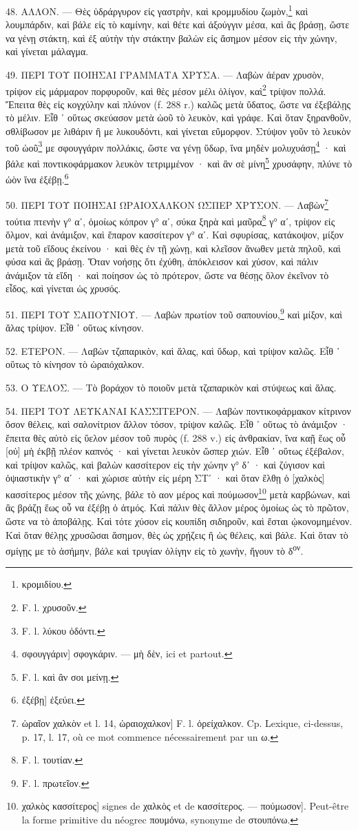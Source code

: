 \documentclass[a4paper, 11pt, oneside, polutonikogreek, french]{article}
\begin{document}
48. ΑΛΛΟΝ. --- Θὲς ὑδράργυρον εἰς γαστρὴν, καὶ κρομμυδίου ζωμὸν,\footnote{κρομιδίου.} καὶ λουμπάρδιν, καὶ βάλε εἰς τὸ καμίνην, καὶ θέτε καὶ ἀξούγγιν μέσα, καὶ ἂς βράσῃ, ὥστε να γένῃ στάκτη, καὶ ἐξ αὐτὴν τὴν στάκτην βαλὼν εἰς ἄσημον μέσον εἰς τὴν χώνην, καὶ γίνεται μάλαγμα.

49. ΠΕΡΙ ΤΟΥ ΠΟΙΗΣΑΙ ΓΡΑΜΜΑΤΑ ΧΡΥΣΑ. --- Λαβὼν ἀέραν χρυσὸν, τρίψον εἰς μάρμαρον πορφυροῦν, καὶ θὲς μέσον μέλι ὀλίγον, καὶ\footnote{F. l. χρυσοῦν.} τρίψον πολλά. Ἔπειτα θὲς εἰς κογχύλην καὶ πλύνον (f. 288 r.) καλῶς μετὰ ὕδατος, ὥστε να ἐξεβάλῃς τὸ μέλιν. Εἶθ ᾽ οὕτως σκεύασον μετὰ ὠοῦ τὸ λευκὸν, καὶ γράφε. Καὶ ὅταν ξηρανθοῦν, σθλίβωσον με λιθάριν ἢ με λυκουδόντι, καὶ γίνεται εὔμορφον. Στύψον γοῦν τὸ λευκὸν τοῦ ὠοῦ\footnote{F. l. λύκου ὀδόντι.} με σφουγγάριν πολλάκις, ὥστε να γένῃ ὕδωρ, ἵνα μηδὲν μολυχυάσῃ\footnote{σφουγγάριν] σφογκάριν. --- μὴ δὲν, ici et partout.} · καὶ βάλε καὶ ποντικοφάρμακον λευκὸν τετριμμένον · καὶ ἂν σὲ μίνη\footnote{F. l. καὶ ἂν σοι μείνῃ.} χρυσάφην, πλύνε τὸ ὠὸν ἵνα ἐξέβῃ.\footnote{ἐξέβῃ] ἐξεύει.}

50. ΠΕΡΙ ΤΟΥ ΠΟΙΗΣΑΙ ΩΡΑΙΟΧΑΛΚΟΝ ΩΣΠΕΡ ΧΡΥΣΟΝ. --- Λαβὼν\footnote{ὡραῖον χαλκὸν et l. 14, ὡραιοχαλκον] F. l. ὀρείχαλκον. Cp. Lexique, ci-dessus, p. 17, l. 17, où ce mot commence nécessairement par un ω.} τούτια πτενὴν γ° αʹ, ὁμοίως κόπρον γ° αʹ, σύκα ξηρὰ καὶ μαῦρα\footnote{F. l. τουτίαν.} γ° αʹ, τρίψον εἰς ὅλμον, καὶ ἀνάμιξον, καὶ ἔπαρον κασσίτερον γ° αʹ. Καὶ σφυρίσας, κατάκοψον, μίξον μετὰ τοῦ εἴδους ἐκείνου · καὶ θὲς ἐν τῇ χώνῃ, καὶ κλεῖσον ἄνωθεν μετὰ πηλοῦ, καὶ φύσα καὶ ἂς βράσῃ. Ὅταν νοήσῃς ὅτι ἐχύθη, ἀπόκλεισον καὶ χύσον, καὶ πάλιν ἀνάμιξον τὰ εἴδη · καὶ ποίησον ὡς τὸ πρότερον, ὥστε να θέσῃς ὅλον ἐκεῖνον τὸ εἶδος, καὶ γίνεται ὡς χρυσός.

51. ΠΕΡΙ ΤΟΥ ΣΑΠΟΥΝΙΟΥ. --- Λαβὼν πρωτίον τοῦ σαπουνίου,\footnote{F. l. πρωτεῖον.} καὶ μίξον, καὶ ἅλας τρίψον. Εἶθ ᾽ οὕτως κίνησον.

52. ΕΤΕΡΟΝ. --- Λαβὼν τζαπαρικὸν, καὶ ἅλας, καὶ ὕδωρ, καὶ τρίψον καλῶς. Εἷθ ᾽ οὕτως τὸ κίνησον τὸ ὡραιόχαλκον.

53. Ο ΥΕΛΟΣ. --- Τὸ βοράχον τὸ ποιοῦν μετὰ τζαπαρικὸν καὶ στύψεως καὶ ἅλας.

54. ΠΕΡΙ ΤΟΥ ΛΕΥΚΑΝΑΙ ΚΑΣΣΙΤΕΡΟΝ. --- Λαβὼν ποντικοφάρμακον κίτρινον ὅσον θέλεις, καὶ σαλονίτριον ἄλλον τόσον, τρίψον καλῶς. Εἶθ ᾽ οὕτως τὸ ἀνάμιξον · ἔπειτα θὲς αὐτὸ εἰς ὕελον μέσον τοῦ πυρὸς (f. 288 v.) εἰς ἀνθρακίαν, ἵνα καῇ ἕως οὗ [οὐ] μὴ ἐκβῇ πλέον καπνός · καὶ γίνεται λευκὸν ὥσπερ χιών. Εἶθ ᾽ οὕτως ἐξέβαλον, καὶ τρίψον καλῶς, καὶ βαλὼν κασσίτερον εἰς τὴν χώνην γ° δʹ · καὶ ζύγισον καὶ ὀψιαστικὴν γ° αʹ · καὶ χώρισε αὐτὴν εἰς μέρη ΣΤʹ · καὶ ὅταν ἔλθῃ ὁ [χαλκὸς] κασσίτερος μέσον τῆς χώνης, βάλε τὸ αον μέρος καὶ πούμωσον\footnote{χαλκὸς κασσίτερος] signes de χαλκὸς et de κασσίτερος. --- πούμωσον]. Peut-être la forme primitive du néogrec πουμόνω, synonyme de στουπόνω.} μετὰ καρβώνων, καὶ ἂς βράζῃ ἕως οὗ να ἐξέβῃ ὁ ἀτμός. Καὶ πάλιν θὲς ἄλλον μέρος ὁμοίως ὡς τὸ πρῶτον, ὥστε να τὸ ἀποβάλῃς. Καὶ τότε χύσον εἰς κουπίδη σιδηροῦν, καὶ ἔσται ᾠκονομημένον. Καὶ ὅταν θέλῃς χρυσῶσαι ἄσημον, θὲς ὡς χρῄζεις ἢ ὡς θέλεις, καὶ βάλε. Καὶ ὅταν τὸ σμίγῃς με τὸ ἀσήμην, βάλε καὶ τρυγίαν ὀλίγην εἰς τὸ χωνὴν, ἤγουν τὸ δ\textsuperscript{ον}.
\end{document}
